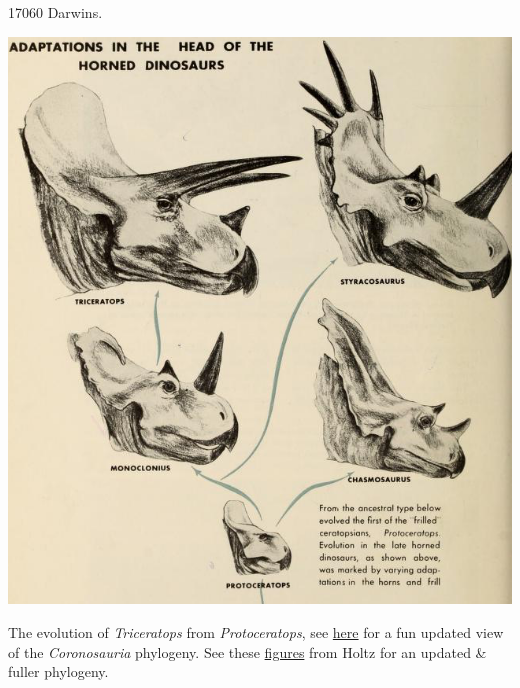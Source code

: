 17060 Darwins.  
\begin{marginfigure}
  \begin{center}
    \includegraphics[width= \textwidth]{illustration_images/Quant_gen/Triceratops/Triceratops_phylo.png}
\end{center}
\caption{The evolution of {\it Triceratops} from {\it Protoceratops},
  see
  \href{https://www.geol.umd.edu/~tholtz/G104/lectures/104margino.html}{here}
  for a fun updated view of the {\it Coronosauria} phylogeny. See
  these
  \href{https://www.geol.umd.edu/~tholtz/G104/lectures/104margino.html}{figures}
  from Holtz for an updated \& fuller phylogeny. } \label{fig:Triceratops_phyl}  
\end{marginfigure}


